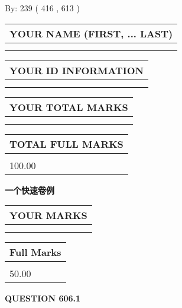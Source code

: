 \documentclass{ctexart}
\begin{document}
   
\hspace{1.0in} By: 
 239 ( 416 ,  613 )
   
   
   
   
\newpage 
\setcounter{page}{ 
   606001 } 
   
   
   
   
\noindent\begin{tabular}{|l|}
\hline
YOUR NAME (FIRST, ... LAST)  \\
\hline
 \\ 
 \\ 
\hline
\end{tabular}
\hspace{0.05in} \begin{tabular}{|l|}
\hline
 YOUR   ID   INFORMATION  \\
\hline
 \\ 
 \\ 
\hline
\end{tabular}
   
   
\vspace{0.2in}\noindent\begin{tabular}{|l|}
\hline
YOUR TOTAL MARKS  \\
\hline
 \\ 
 \\ 
\hline
\end{tabular}
\hspace{0.05in} \begin{tabular}{|l|}
\hline
TOTAL FULL MARKS  \\
\hline
 \\ 
100.00 \\
\hline
\end{tabular}
   
   
 \vspace{0.2in}
{\LARGE {\textbf{ 一个快速卷例}}}
   
   
  
\vspace{0.2in}
  
\noindent\begin{tabular}{|l|}
\hline
 YOUR MARKS  \\
\hline
 \\ 
 \\ 
\hline
\end{tabular}
\hspace{0.05in} \begin{tabular}{|l|}
\hline
 Full Marks  \\
\hline
 \\ 
50.00 \\
\hline
\end{tabular}
{\textbf{\Large{QUESTION
606.1 
}}}
  
\end{document}
